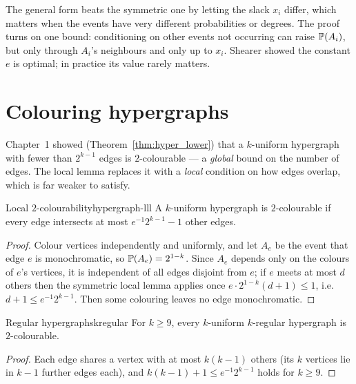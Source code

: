 \begin{insight}
The general form beats the symmetric one by letting the slack $x_i$ differ,
which matters when the events have very different probabilities or degrees. The
proof turns on one bound: conditioning on other events not occurring can raise
$\mathbb{P}(A_i)$, but only through $A_i$'s neighbours and only up to $x_i$. Shearer
showed the constant $e$ is optimal; in practice its value rarely matters.
\end{insight}

\section{Colouring hypergraphs}

Chapter~1 showed (Theorem~\ref{thm:hyper_lower}) that a $k$-uniform hypergraph
with fewer than $2^{k-1}$ edges is $2$-colourable --- a \emph{global} bound on the
number of edges. The local lemma replaces it with a \emph{local} condition on
how edges overlap, which is far weaker to satisfy.

\begin{theorem}{Local $2$-colourability}{hypergraph-lll}
A $k$-uniform hypergraph is $2$-colourable if every edge intersects at most
$e^{-1}2^{k-1}-1$ other edges.
\end{theorem}

\begin{proof}
Colour vertices independently and uniformly, and let $A_e$ be the event that
edge $e$ is monochromatic, so $\mathbb{P}(A_e)=2^{1-k}$. Since $A_e$ depends only on
the colours of $e$'s vertices, it is independent of all edges disjoint from
$e$; if $e$ meets at most $d$ others then the symmetric local lemma applies once
$e\cdot2^{1-k}(d+1)\le1$, i.e.\ $d+1\le e^{-1}2^{k-1}$. Then some colouring
leaves no edge monochromatic.
\end{proof}

\begin{corollary}{Regular hypergraphs}{kregular}
For $k\ge9$, every $k$-uniform $k$-regular hypergraph is $2$-colourable.
\end{corollary}

\begin{proof}
Each edge shares a vertex with at most $k(k-1)$ others (its $k$ vertices lie in
$k-1$ further edges each), and $k(k-1)+1\le e^{-1}2^{k-1}$ holds for $k\ge9$.
\end{proof}

